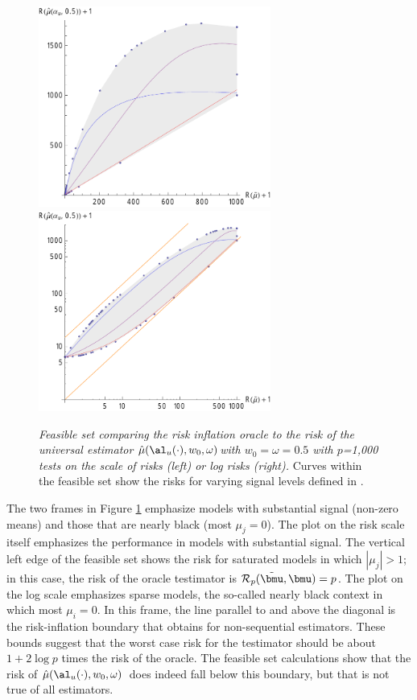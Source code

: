 \documentclass[12pt]{article}
\newcommand{\uTest}{\mbox{$\hat\mu(\al_u(\cdot),w_0,\omega)$}}
\begin{document}
 \begin{figure}
 \caption{ \label{fig:riFeasibleSet} {\sl Feasible set comparing the risk
 inflation oracle to the risk of the universal estimator \uTest with
 $w_0=\omega=0.5$ with $p$=1,000 tests on the scale of risks (left) or log risks
 (right).}  Curves within the feasible set show the risks for varying signal
 levels defined in . }

 \vspace{0.1in}
\centerline{
 \includegraphics[width=3.0in]{figures/riFeasSet}
 \includegraphics[width=3.0in]{figures/riFeasSetLog} }
 \vspace{0.2in}
 \end{figure}

 The two frames in Figure \ref{fig:riFeasibleSet} emphasize models with
 substantial signal (non-zero means) and those that are nearly black (most
 $\mu_j=0$).  The plot on the risk scale itself emphasizes the performance in
 models with substantial signal.  The vertical left edge of the feasible set
 shows the risk for saturated models in which $|\mu_j| > 1$; in this case, the
 risk of the oracle testimator is ${\cal R}_p(\tilde{\bmu}, \bmu) = p$.  The
 plot on the log scale emphasizes sparse models, the so-called nearly black
 context in which most $\mu_i = 0$.  In this frame, the line parallel to and
 above the diagonal is the risk-inflation boundary  that obtains for
 non-sequential estimators.  These bounds suggest that the worst case risk for
 the testimator should be about $1 + 2 \log p$ times the risk of the oracle.
  The feasible set calculations show that the risk of \uTest\ does indeed fall
 below this boundary, but that is not true of all estimators.  
\end{document}
